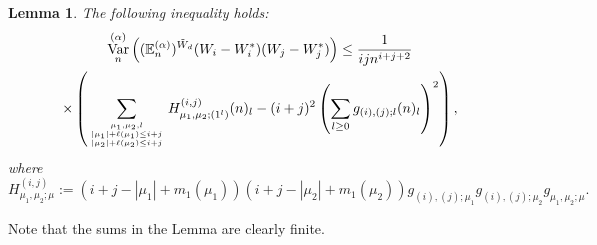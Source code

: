 \documentclass[11pt]{amsart}
\theoremstyle{plain}
\newtheorem{lemma}{Lemma}[section]
\theoremstyle{remark}
\newcommand{\esper}{\mathbb{E}}
\DeclareMathOperator{\Var}{Var}
\begin{document}
\begin{lemma}
\label{lem:fourth_moment}
The following inequality holds:
\begin{multline}
\Var_n^{(\alpha)}\left((\esper_n^{(\alpha)})^{\tilde{W}_d}(W_i - W_i^*)(W_j - W_j^*)\right) \leq \frac{1}{ij n^{i+j+2}}\\
\times \left(\sum_{\mu_1, \mu_2, l \atop 
{\tiny |\mu_1|+\ell(\mu_1) \le i+j \atop |\mu_2|+\ell(\mu_2) \le i+j} }
H^{(i,j)}_{\mu_1, \mu_2; (1^l)} (n)_l - (i+j)^2\left(\sum_{l \ge 0} g_{(i), (j); l} (n)_l \right)^2 \right),
\end{multline}
where 
\[ H^{(i,j)}_{\mu_1, \mu_2; \mu} := (i+j-|\mu_1|+m_1(\mu_1))(i+j-|\mu_2|+m_1(\mu_2))g_{(i),(j); \mu_1}g_{(i),(j); \mu_2}g_{\mu_1,\mu_2; \mu}. \]
\end{lemma}
Note that the sums in the Lemma are clearly finite.
\end{document}
